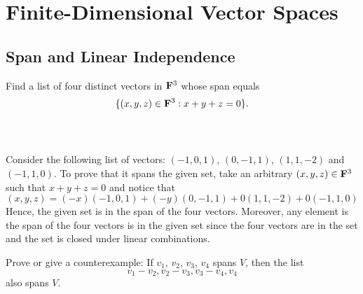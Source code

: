 \chapter{Finite-Dimensional Vector Spaces}

\section{Span and Linear Independence}

\begin{exercise}
    Find a list of four distinct vectors in $\mathbf{F}^3$ whose span equals
    $$\{(x,y,z) \in \mathbf{F}^3 :  x+ y + z = 0\}.$$ \\
\end{exercise}

\begin{solution}
    \\ Consider the following list of vectors: $(-1,0,1)$, $(0, -1, 1)$, $(1, 1, -2)$ and $(-1, 1, 0)$. To prove that it spans the given set, take an arbitrary $(x,y,z) \in \mathbf{F}^3$ such that $x+y+z=0$ and notice that
    $$(x,y,z) = (-x)(-1,0,1) + (-y)(0,-1,1) + 0(1,1,-2) + 0(-1, 1,0)$$
    Hence, the given set is in the span of the four vectors. Moreover, any element is the span of the four vectors is in the given set since the four vectors are in the set and the set is closed under linear combinations. \\
\end{solution}

\begin{exercise}
    Prove or give a counterexample: If $v_1$, $v_2$, $v_3$, $v_4$ spans $V$, then the list 
    $$v_1 - v_2, v_2 - v_3, v_3 - v_4, v_4$$
    also spans $V$. \\
\end{exercise}

